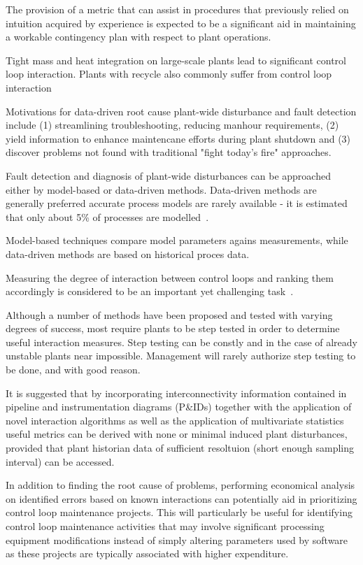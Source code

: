 \documentclass{article}
\begin{document}
The provision of a metric that can assist in procedures that previously relied on intuition acquired by experience is expected to be a significant aid in maintaining a workable contingency plan with respect to plant operations.


Tight mass and heat integration on large-scale plants lead to significant control loop interaction.
Plants with recycle also commonly suffer from control loop interaction~\cite{Bauer2005a}

Motivations for data-driven root cause plant-wide disturbance and fault detection include (1) streamlining troubleshooting, reducing manhour requirements, (2) yield information to enhance maintencane efforts during plant shutdown and (3) discover problems not found with traditional "fight today's fire" approaches.~\cite{Bauer2005a}

Fault detection and diagnosis of plant-wide disturbances can be approached either by model-based or data-driven methods.
Data-driven methods are generally preferred accurate process models are rarely available - it is estimated that only about 5\% of processes are modelled~\cite{Bauer2005a}. %

Model-based techniques compare model parameters agains measurements, while data-driven methods are based on historical proces data.

Measuring the degree of interaction between control loops and ranking them accordingly is considered to be an important yet challenging task~\cite{Rahman2011}.

Although a  number of methods have been proposed and tested with varying degrees of success, most require plants to be step tested in order to determine useful interaction measures.
Step testing can be constly and in the case of already unstable plants near impossible.
Management will rarely authorize step testing to be done, and with good reason.

It is suggested that by incorporating interconnectivity information contained in pipeline and instrumentation diagrams (P\&IDs) together with the application of novel interaction algorithms as well as the application of multivariate statistics useful metrics can be derived with none or minimal induced plant disturbances, provided that plant historian data of sufficient resoltuion (short enough sampling interval) can be accessed.

In addition to finding the root cause of problems, performing economical analysis on identified errors based on known interactions can potentially aid in prioritizing control loop maintenance projects.
This will particularly be useful for identifying control loop maintenance activities that may involve significant processing equipment modifications instead of simply altering parameters used by software as these projects are typically associated with higher expenditure.
\end{document}
